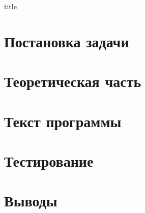 \documentclass[12pt,a4paper]{article}
\begin{document}
{title} %


\section{Постановка задачи}


\section{Теоретическая часть}


\section{Текст программы}


\section{Тестирование}


\section{Выводы}
\end{document}

